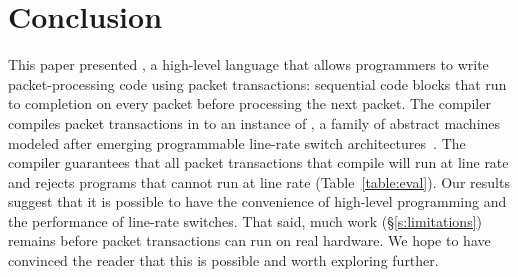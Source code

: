 \section{Conclusion}
\label{s:conclusion}

This paper presented \pktlanguage, a high-level language that allows
programmers to write packet-processing code using packet transactions:
sequential code blocks that run to completion on every packet before processing
the next packet. The \pktlanguage compiler compiles packet transactions in
\pktlanguage to an instance of \absmachine, a family of abstract machines
modeled after emerging programmable line-rate switch
architectures~\cite{flexpipe, xpliant, rmt}. The compiler guarantees that all
packet transactions that compile will run at line rate and rejects \pktlanguage
programs that cannot run at line rate (Table~\ref{table:eval}). Our results
suggest that it is possible to have the convenience of high-level programming
and the performance of line-rate switches. That said, much work
(\S\ref{s:limitations}) remains before packet transactions can run on real
hardware. We hope to have convinced the reader that this is possible and
worth exploring further.
